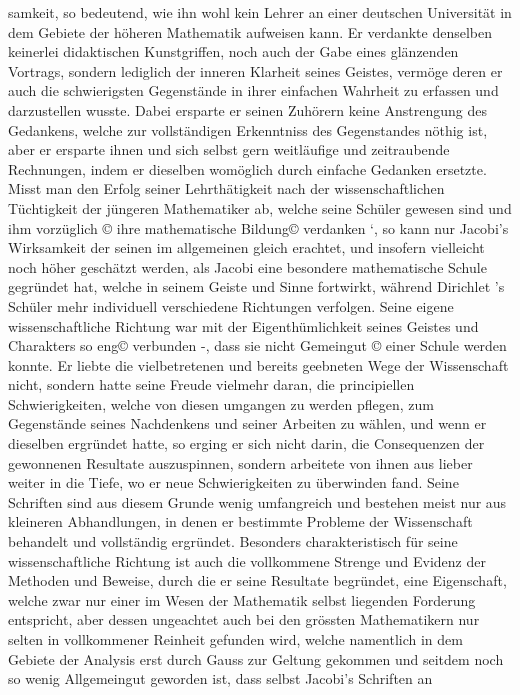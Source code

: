 \documentclass[11pt]{article}
\begin{document}
\noindent samkeit, so bedeutend, wie ihn wohl kein Lehrer an einer deutschen Universität in dem Gebiete der höheren Mathematik aufweisen kann. Er verdankte denselben keinerlei didaktischen Kunstgriffen, noch auch der Gabe eines glänzenden Vortrags, sondern lediglich der inneren Klarheit seines Geistes, vermöge deren er auch die schwierigsten Gegenstände in ihrer einfachen Wahrheit zu erfassen und darzustellen wusste. Dabei ersparte er seinen Zuhörern keine Anstrengung des Gedankens, welche zur vollständigen Erkenntniss des Gegenstandes nöthig ist, aber er ersparte ihnen und sich selbst gern weitläufige und zeitraubende Rechnungen, indem er dieselben womöglich durch einfache Gedanken ersetzte. Misst man den Erfolg seiner Lehrthätigkeit nach der wissenschaftlichen Tüchtigkeit der jüngeren Mathematiker ab, welche seine Schüler gewesen sind und ihm vorzüglich © ihre mathematische Bildung© verdanken ‘, so kann nur Jacobi’s Wirksamkeit der seinen im allgemeinen gleich erachtet, und insofern vielleicht noch höher geschätzt werden, als Jacobi eine besondere mathematische Schule gegründet hat, welche in seinem Geiste und Sinne fortwirkt, während Dirichlet ’s Schüler mehr individuell verschiedene Richtungen verfolgen. Seine eigene wissenschaftliche Richtung war mit der Eigenthümlichkeit seines Geistes und Charakters so eng© verbunden -, dass sie nicht Gemeingut © einer Schule werden konnte. Er liebte die vielbetretenen und bereits geebneten Wege der Wissenschaft nicht, sondern hatte seine Freude vielmehr daran, die principiellen Schwierigkeiten, welche von diesen umgangen zu werden pflegen, zum Gegenstände seines Nachdenkens und seiner Arbeiten zu wählen, und wenn er dieselben ergründet hatte, so erging er sich nicht darin, die Consequenzen der gewonnenen Resultate auszuspinnen, sondern arbeitete von ihnen aus lieber weiter in die Tiefe, wo er neue Schwierigkeiten zu überwinden fand. Seine Schriften sind aus diesem Grunde wenig umfangreich und bestehen meist nur aus kleineren Abhandlungen, in denen er bestimmte Probleme der Wissenschaft behandelt und vollständig ergründet. Besonders charakteristisch für seine wissenschaftliche Richtung ist auch die vollkommene Strenge und Evidenz der Methoden und Beweise, durch die er seine Resultate begründet, eine Eigenschaft, welche zwar nur einer im Wesen der Mathematik selbst liegenden Forderung entspricht, aber dessen ungeachtet auch bei den grössten Mathematikern nur selten in vollkommener Reinheit gefunden wird, welche namentlich in dem Gebiete der Analysis erst durch Gauss zur Geltung gekommen und seitdem noch so wenig Allgemeingut geworden ist, dass selbst Jacobi’s Schriften an 
\par
\end{document}
